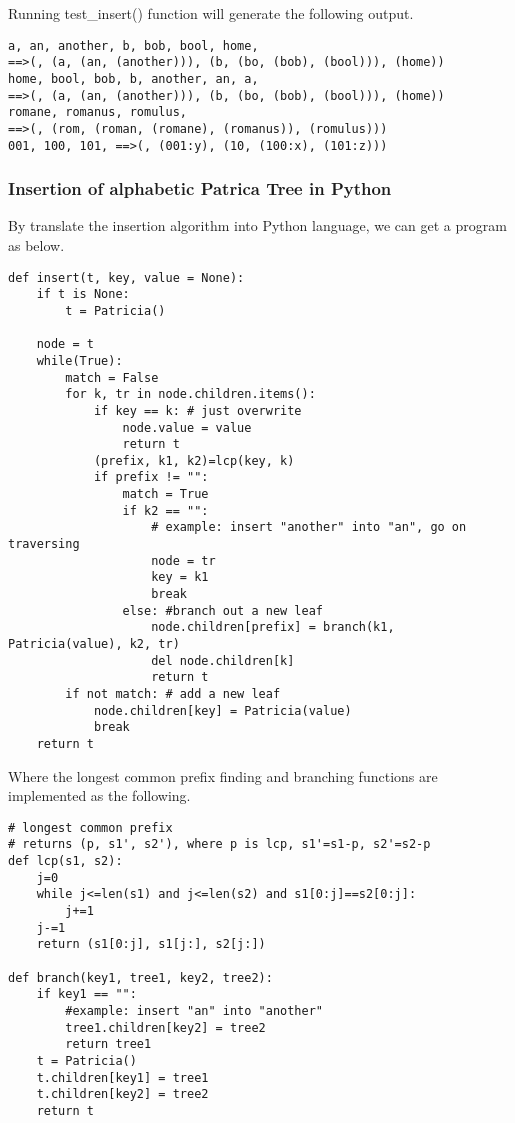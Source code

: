 \documentclass{article}
\begin{document}
Running test\_insert() function will generate the following output.

\begin{verbatim}
a, an, another, b, bob, bool, home, 
==>(, (a, (an, (another))), (b, (bo, (bob), (bool))), (home))
home, bool, bob, b, another, an, a, 
==>(, (a, (an, (another))), (b, (bo, (bob), (bool))), (home))
romane, romanus, romulus, 
==>(, (rom, (roman, (romane), (romanus)), (romulus)))
001, 100, 101, ==>(, (001:y), (10, (100:x), (101:z)))
\end{verbatim}

\subsubsection*{Insertion of alphabetic Patrica Tree in Python}
By translate the insertion algorithm into Python language, we can get a
program as below.

\lstset{language=Python}
\begin{lstlisting}
def insert(t, key, value = None):
    if t is None:
        t = Patricia()

    node = t
    while(True):
        match = False
        for k, tr in node.children.items():
            if key == k: # just overwrite
                node.value = value
                return t
            (prefix, k1, k2)=lcp(key, k)
            if prefix != "":
                match = True
                if k2 == "": 
                    # example: insert "another" into "an", go on traversing
                    node = tr
                    key = k1
                    break
                else: #branch out a new leaf
                    node.children[prefix] = branch(k1, Patricia(value), k2, tr)
                    del node.children[k]
                    return t
        if not match: # add a new leaf
            node.children[key] = Patricia(value)
            break
    return t
\end{lstlisting}

Where the longest common prefix finding and branching functions are implemented
as the following.

\begin{lstlisting}
# longest common prefix
# returns (p, s1', s2'), where p is lcp, s1'=s1-p, s2'=s2-p
def lcp(s1, s2):
    j=0
    while j<=len(s1) and j<=len(s2) and s1[0:j]==s2[0:j]:
        j+=1
    j-=1
    return (s1[0:j], s1[j:], s2[j:])

def branch(key1, tree1, key2, tree2):
    if key1 == "":
        #example: insert "an" into "another"
        tree1.children[key2] = tree2
        return tree1
    t = Patricia()
    t.children[key1] = tree1
    t.children[key2] = tree2
    return t
\end{lstlisting}
\end{document}
